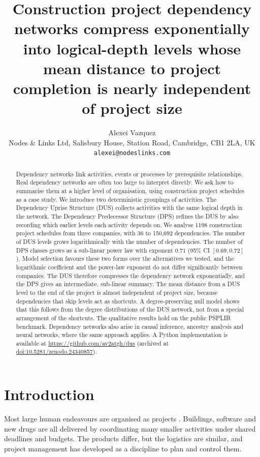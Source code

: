 \documentclass[11pt,a4paper]{article}
\title{Construction project dependency networks compress exponentially into
logical-depth levels whose mean distance to project completion is nearly
independent of project size}
\author{Alexei Vazquez\\
\small Nodes \& Links Ltd, Salisbury House, Station Road, Cambridge, CB1 2LA, UK\\
\small \texttt{alexei@nodeslinks.com}}
\date{}
\begin{document}
\maketitle

\begin{abstract}
Dependency networks link activities, events or processes by prerequisite relationships. Real dependency networks are often too large to interpret directly. We ask how to summarise them at a higher level of organisation, using construction project schedules as a case study. We introduce two deterministic groupings of activities. The Dependency Uprise Structure (DUS) collects activities with the same logical depth in the network. The Dependency Predecessor Structure (DPS) refines the DUS by also recording which earlier levels each activity depends on. We analyse 1198 construction project schedules from three companies, with 36 to 150{,}692 dependencies. The number of DUS levels grows logarithmically with the number of dependencies. The number of DPS classes grows as a sub-linear power law with exponent $0.71$ (95\% CI $[0.69, 0.72]$). Model selection favours these two forms over the alternatives we tested, and the logarithmic coefficient and the power-law exponent do not differ significantly between companies. The DUS therefore compresses the dependency network exponentially, and the DPS gives an intermediate, sub-linear summary. The mean distance from a DUS level to the end of the project is almost independent of project size, because dependencies that skip levels act as shortcuts. A degree-preserving null model shows that this follows from the degree distributions of the DUS network, not from a special arrangement of the shortcuts. The qualitative results hold on the public PSPLIB benchmark. Dependency networks also arise in causal inference, ancestry analysis and neural networks, where the same approach applies. A Python implementation is available at \url{https://github.com/av2atgh/dus} (archived at \href{https://doi.org/10.5281/zenodo.24340857}{doi:10.5281/zenodo.24340857}).
\end{abstract}

\section*{Introduction}

Most large human endeavours are organised as projects \cite{jensen16, schoper2017projectification, wagner2021projectification}. Buildings, software and new drugs are all delivered by coordinating many smaller activities under shared deadlines and budgets. The products differ, but the logistics are similar, and project management has developed as a discipline to plan and control them.
\end{document}
